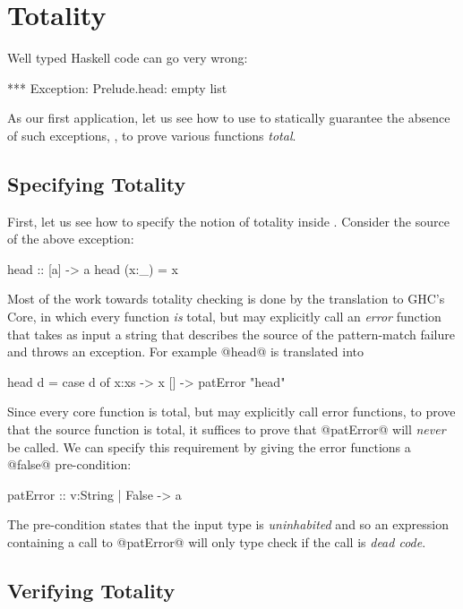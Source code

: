 \section{Totality}\label{sec:totality}
Well typed Haskell code can go very wrong:
%
\begin{code}
  *** Exception: Prelude.head: empty list
\end{code}
%
As our first application, let us see how to use 
\toolname to statically guarantee the absence
of such exceptions, \ie, to prove various 
functions \emph{total}.

\subsection{Specifying Totality}

First, let us see how to specify the notion of
totality inside \toolname. Consider the source of 
the above exception:
%
\begin{code}
  head :: [a] -> a
  head (x:_) = x
\end{code}
%
Most of the work towards totality checking is done by 
the translation to GHC's Core, in which every function 
\emph{is} total, but may explicitly call an \emph{error} 
function that takes as input a string that describes the 
source of the pattern-match failure and throws an exception.
%
For example @head@ is translated into
%
\begin{code}
  head d = case d of 
             x:xs -> x
             []   -> patError "head"
\end{code}

Since every core function is total, but may explicitly 
call error functions, to prove that the source function is 
total, it suffices to prove that @patError@ 
will \emph{never} be called.
%
We can specify this requirement by giving the error 
functions a @false@ pre-condition:
%
\begin{code}
  patError :: {v:String | False } -> a
\end{code}
%
The pre-condition states that the input type is \emph{uninhabited}
and so an expression containing a call to @patError@ will only type 
check if the call is \emph{dead code}.


\subsection{Verifying Totality}

